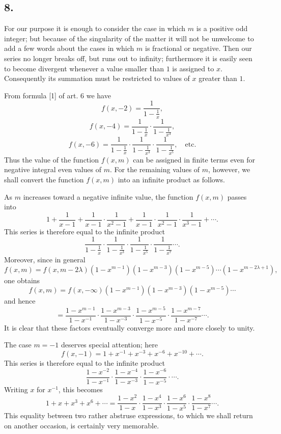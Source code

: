 \documentclass[12pt]{article}
\begin{document}
\subsection*{8.}

For our purpose it is enough to consider the case in which $m$ is a positive odd integer; but because of the singularity of the matter it will not be unwelcome to add a few words about the cases in which $m$ is fractional or negative. Then our series no longer breaks off, but runs out to infinity; furthermore it is easily seen to become divergent whenever a value smaller than $1$ is assigned to $x$. Consequently its summation must be restricted to values of $x$ greater than $1$.

From formula [1] of art. 6 we have
\[
f(x,-2)=\frac{1}{1-\frac1x},
\]
\[
f(x,-4)=\frac{1}{1-\frac1x}\cdot\frac{1}{1-\frac1{x^3}},
\]
\[
f(x,-6)=\frac{1}{1-\frac1x}\cdot\frac{1}{1-\frac1{x^3}}\cdot\frac{1}{1-\frac1{x^5}},\quad\text{etc.}
\]
Thus the value of the function $f(x,m)$ can be assigned in finite terms even for negative integral even values of $m$. For the remaining values of $m$, however, we shall convert the function $f(x,m)$ into an infinite product as follows.

As $m$ increases toward a negative infinite value, the function $f(x,m)$ passes into
\[
1+\frac{1}{x-1}
+\frac{1}{x-1}\cdot\frac{1}{x^2-1}
+\frac{1}{x-1}\cdot\frac{1}{x^2-1}\cdot\frac{1}{x^3-1}
+\cdots.
\]
This series is therefore equal to the infinite product
\[
\frac{1}{1-\frac1x}\cdot\frac{1}{1-\frac1{x^3}}\cdot
\frac{1}{1-\frac1{x^5}}\cdot\frac{1}{1-\frac1{x^7}}\cdots.
\]
Moreover, since in general
\[
f(x,m)=f(x,m-2\lambda)(1-x^{m-1})(1-x^{m-3})(1-x^{m-5})\cdots(1-x^{m-2\lambda+1}),
\]
one obtains
\[
f(x,m)=f(x,-\infty)(1-x^{m-1})(1-x^{m-3})(1-x^{m-5})\cdots
\]
and hence
\[
=\frac{1-x^{m-1}}{1-x^{-1}}\cdot
\frac{1-x^{m-3}}{1-x^{-3}}\cdot
\frac{1-x^{m-5}}{1-x^{-5}}\cdot
\frac{1-x^{m-7}}{1-x^{-7}}\cdots.
\]
It is clear that these factors eventually converge more and more closely to unity.

The case $m=-1$ deserves special attention; here
\[
f(x,-1)=1+x^{-1}+x^{-3}+x^{-6}+x^{-10}+\cdots.
\]
This series is therefore equal to the infinite product
\[
\frac{1-x^{-2}}{1-x^{-1}}\cdot
\frac{1-x^{-4}}{1-x^{-3}}\cdot
\frac{1-x^{-6}}{1-x^{-5}}\cdot\cdots.
\]
Writing $x$ for $x^{-1}$, this becomes
\[
1+x+x^3+x^6+\cdots
=
\frac{1-x^2}{1-x}\cdot
\frac{1-x^4}{1-x^3}\cdot
\frac{1-x^6}{1-x^5}\cdot
\frac{1-x^8}{1-x^7}\cdots.
\]
This equality between two rather abstruse expressions, to which we shall return on another occasion, is certainly very memorable.
\end{document}
